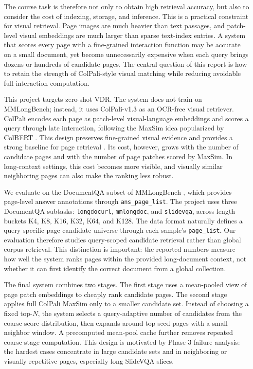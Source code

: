 \documentclass[11pt]{article}
\begin{document}
The course task is therefore not only to obtain high retrieval accuracy, but also to consider the cost of indexing, storage, and inference. This is a practical constraint for visual retrieval. Page images are much heavier than text passages, and patch-level visual embeddings are much larger than sparse text-index entries. A system that scores every page with a fine-grained interaction function may be accurate on a small document, yet become unnecessarily expensive when each query brings dozens or hundreds of candidate pages. The central question of this report is how to retain the strength of ColPali-style visual matching while reducing avoidable full-interaction computation.

This project targets zero-shot VDR. The system does not train on MMLongBench; instead, it uses ColPali-v1.3 as an OCR-free visual retriever. ColPali encodes each page as patch-level visual-language embeddings and scores a query through late interaction, following the MaxSim idea popularized by ColBERT \citep{khattab2020colbert}. This design preserves fine-grained visual evidence and provides a strong baseline for page retrieval \citep{faysse2024colpali}. Its cost, however, grows with the number of candidate pages and with the number of page patches scored by MaxSim. In long-context settings, this cost becomes more visible, and visually similar neighboring pages can also make the ranking less robust.

We evaluate on the DocumentQA subset of MMLongBench \citep{wang2025mmlongbench,mmlongbenchdataset}, which provides page-level answer annotations through \texttt{ans\_page\_list}. The project uses three DocumentQA subtasks: \texttt{longdocurl}, \texttt{mmlongdoc}, and \texttt{slidevqa}, across length buckets K4, K8, K16, K32, K64, and K128. The data format naturally defines a query-specific page candidate universe through each sample's \texttt{page\_list}. Our evaluation therefore studies query-scoped candidate retrieval rather than global corpus retrieval. This distinction is important: the reported numbers measure how well the system ranks pages within the provided long-document context, not whether it can first identify the correct document from a global collection.

The final system combines two stages. The first stage uses a mean-pooled view of page patch embeddings to cheaply rank candidate pages. The second stage applies full ColPali MaxSim only to a smaller candidate set. Instead of choosing a fixed top-$N$, the system selects a query-adaptive number of candidates from the coarse score distribution, then expands around top seed pages with a small neighbor window. A precomputed mean-pool cache further removes repeated coarse-stage computation. This design is motivated by Phase 3 failure analysis: the hardest cases concentrate in large candidate sets and in neighboring or visually repetitive pages, especially long SlideVQA slices.
\end{document}
